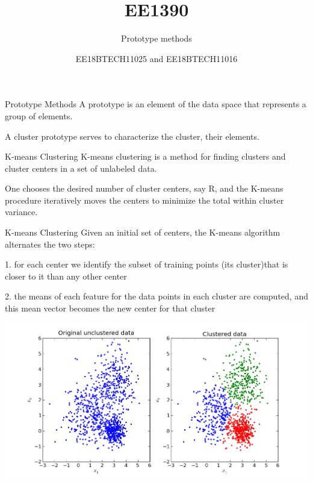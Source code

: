\documentclass{beamer}
\title[]{EE1390}
\subtitle{Prototype methods}
\author{EE18BTECH11025 and EE18BTECH11016}
\date{}
\begin{document}
\begin{frame}
\titlepage
\end{frame}

\begin{frame}{Prototype Methods}
A prototype is an element of the data space that represents a group of elements.

A cluster prototype serves to characterize the cluster, their elements.


\end{frame}

\begin{frame}{ K-means Clustering}
K-means clustering is a method for finding clusters and cluster centers in a set of unlabeled data.

 One chooses the desired number of cluster centers, say R, and the K-means procedure iteratively moves the centers to minimize the total within cluster variance.
 \end{frame}
 
 \begin{frame}{ K-means Clustering}
 Given an initial set of centers, the K-means algorithm alternates the two steps:

  1. for each center we identify the subset of training points (its cluster)that is closer to it than any other center
  
  
  2. the means of each feature for the data points in each cluster are computed, and this mean vector becomes the new center for that cluster
 
\end{frame}


\begin{frame}
\includegraphics[scale=.3]{1.png}  
\end{frame}
\end{document}

